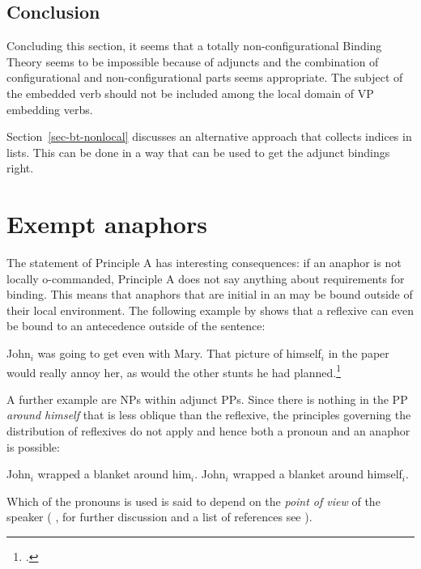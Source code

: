\documentclass[output=paper
	        ,collection
	        ,collectionchapter
 	        ,biblatex
                ,babelshorthands
                ,newtxmath
                ,draftmode
                ,colorlinks, citecolor=brown
]{langscibook}
\begin{document}
\subsection{Conclusion}

Concluding this section, it seems that a totally non-configurational Binding Theory seems to be
impossible because of adjuncts and the combination of configurational and non-configurational parts
seems appropriate. The subject of the embedded verb should not be included among the local domain of
VP embedding verbs.

Section~\ref{sec-bt-nonlocal} discusses an alternative approach that collects indices in lists. This can be done in a
way that can be used to get the adjunct bindings right.
 

\section{Exempt anaphors}
\label{sec-excempt-anaphors}

The statement of Principle A has interesting consequences: if an anaphor is not locally o-commanded,
Principle A does not say anything about requirements for binding. This means that anaphors that are
initial in an \argstl may be bound outside of their local environment. The following example by
\citet[]{ps2} shows that a reflexive can even be bound to an antecedence outside of the sentence:

\ea
John$_i$ was going to get even with Mary. That picture of himself$_i$
in the paper would really annoy her, as would the other stunts he had planned.\footnote{
        .
}
\z

A further example are NPs within adjunct PPs. Since there is nothing in the PP \emph{around
  himself} that is less oblique than the reflexive, the principles governing the distribution of
reflexives do not apply and hence both a pronoun and an anaphor is possible:

\eal
\ex John$_i$ wrapped a blanket around him$_i$.
\ex John$_i$ wrapped a blanket around himself$_i$.
\zl

\noindent
Which of the pronouns is used is said to depend on the \emph{point of view} of the speaker
(%
\citealp{Kuroda1973a-u}, for further discussion and a list of references see \citealp[]{ps2}).

\end{document}
